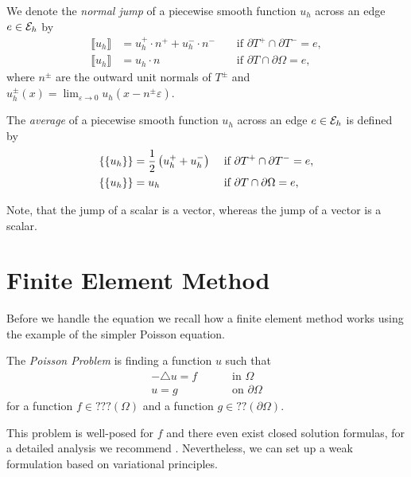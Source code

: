 \begin{definition}
We denote the \emph{normal jump} of  a piecewise smooth function $u_h$ across an edge $e \in \mathcal{E}_h$ by
\begin{align*}
	\llbracket u_h \rrbracket &= u_h^+ \cdot n^+ + u_h^-\cdot n^-  &&\text{ if } \partial T^+ \cap \partial T^- = e, \\
	\llbracket u_h \rrbracket &= u_h \cdot n  &&\text{ if } \partial T \cap \partial \Omega = e,
\end{align*}
where $n^\pm$ are the outward unit normals of $T^\pm$ and  $u_h^\pm(x) = \lim_{\varepsilon \rightarrow 0} u_h(x-n^\pm \varepsilon)$.

The \emph{average} of a piecewise smooth function $u_h$ across an edge $e \in \mathcal{E}_h$ is defined by
\begin{align*}
	\{\{ u_h \}\} &= \frac 1 2 \left(u_h^+ + u_h^-\right) &&\text{ if } \partial T^+ \cap \partial T^- = e, \\
	\{\{ u_h  \}\} &= u_h &&\text{ if } \partial T \cap \partial \Omega = e,
\end{align*}
\end{definition}

Note, that the jump of a scalar is a vector, whereas the jump of a vector is a scalar.


\section{Finite Element Method}
Before we handle the \MA equation we recall how a finite element method works using the example of the simpler Poisson equation. 


\begin{definition}
The \emph{Poisson Problem} is finding a function $u$ such that 
\begin{align}
	-\triangle u = f \qquad &\text{ in }\Omega \label{eq: poisson eq} \\
	u = g \qquad &\text{ on } \partial \Omega    \label{eq: poisson bc}
\end{align}
for a function $f \in ???(\Omega)$ and a function $g \in ??(\partial \Omega)$. 
\end{definition}

This problem is well-posed  for $f$ and there even exist closed solution formulas, for a detailed analysis we recommend  \cite{evans1998}.
Nevertheless, we can set up a weak formulation based on variational principles.

